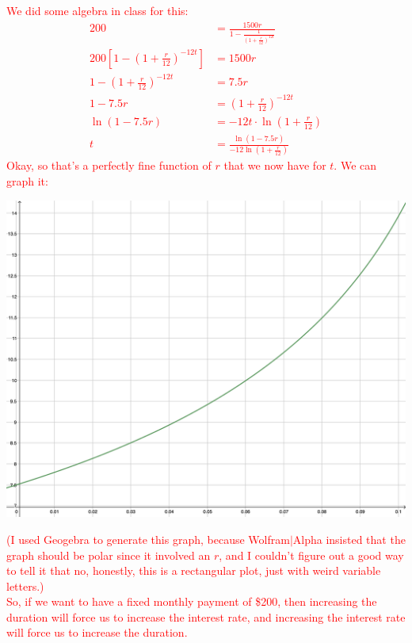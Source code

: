 \documentclass[10pt]{article}
\newcommand{\red}[1]{ %
\textcolor{red}{#1} }%
\begin{document}
\begin{enumerate}[leftmargin=0pt]
\begin{enumerate}
        \red{ We did some algebra in class for this:
        \begin{align*}
            200 &= \frac{1500r}{1-\frac{1}{\left(1+\frac{r}{12}\right)^{12t}}}\\
            200\left[1-\left(1+\frac{r}{12}\right)^{-12t}\right] &= 1500r \\
            1-\left(1+\frac{r}{12}\right)^{-12t} &= 7.5 r \\
            1-7.5r &= \left(1+\frac{r}{12}\right)^{-12t}\\
            \ln(1-7.5r) &= -12t \cdot \ln\left(1+\frac{r}{12}\right) \\
            t &= \frac{\ln(1-7.5r)}{-12\ln\left(1+\frac{r}{12}\right)}
        \end{align*}
        Okay, so that's a perfectly fine function of $r$ that we now have for $t$. We can graph it:\\
        \begin{center}
            \includegraphics[scale=0.09]{geogebra-export.png}\\
        \end{center}
        (I used Geogebra to generate this graph, because Wolfram$|$Alpha insisted that the graph should be polar since it involved an $r$, and I couldn't figure out a good way to tell it that no, honestly, this is a rectangular plot, just with weird variable letters.)\\
        So, if we want to have a fixed monthly payment of \$200, then increasing the duration will force us to increase the interest rate, and increasing the interest rate will force us to increase the duration.\\
}
\end{enumerate}
\end{enumerate}
\end{document}
